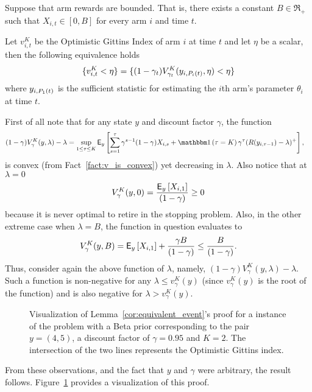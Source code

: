 \begin{lemma} \label{cor:equivalent_event}
	Suppose that arm rewards are bounded. That is, there exists a constant $B \in \Re_+$ such that $X_{i,t} \in [0, B]$ for every arm $i$ and time $t$. 
	
	Let $v^K_{i,t}$ be the Optimistic Gittins Index of arm $i$ at time $t$ and let $\eta$ be a scalar, then the following equivalence holds
	\[
	\{v^K_{i,t} < \eta \} = \{(1-\gamma_t)V^K_{\gamma_t}(y_{i,P_{i}(t)}, \eta) < \eta\}\]
	where $y_{i,P_{1}(t)}$ is the sufficient statistic for estimating the $i$th arm's parameter $\theta_i$ at time $t$.
\end{lemma}
\begin{myproof}[Proof.]
	First of all note that for any state $y$ and discount factor $\gamma$, the function
	\begin{align*}
	(1-\gamma)V^K_\gamma(y, \lambda) - \lambda&  = \sup_{1 \le \tau \le K}\E_y\left[\sum_{s=1}^\tau\gamma^{s-1}(1-\gamma)X_{i,s} + \ind{\tau = K}\gamma^\tau(R(y_{i,\tau-1}) - \lambda)^+\right],
	\end{align*}
	is convex (from Fact~\ref{fact:v_is_convex}) yet decreasing in $\lambda$. Also notice that at $\lambda = 0$
	\[
		V^K_{\gamma}(y, 0) = \frac{\mathsf{E}_y\left[X_{i,1}\right]}{(1-\gamma)} \ge 0
	\]
	because it is never optimal to retire in the stopping problem. Also, in the other extreme case when $\lambda = B$, the function in question evaluates to
	\[
		V^K_{\gamma}(y, B) = \mathsf{E}_y\left[X_{i,1}\right] + \frac{\gamma B}{(1-\gamma)} \le \frac{B}{(1-\gamma)}.
	\]
	Thus, consider again the above function of $\lambda$, namely,  $(1-\gamma)V^K_\gamma(y, \lambda) - \lambda$. Such a function is non-negative for any $\lambda \le v^K_\gamma(y)$ (since $v^K_\gamma(y)$ is the root of the function) and is also negative for $\lambda > v^K_\gamma(y)$.
	\begin{figure}
		\centering
		 
		\caption{Visualization of Lemma~\ref{cor:equivalent_event}'s proof for a instance of the problem with a Beta prior corresponding to the pair $y = (4,5)$, a discount factor of $\gamma=0.95$ and $K = 2$. The intersection of the two lines represents the Optimistic Gittins index.}
		\label{fig:visaulize_gx_proof}
	\end{figure}
	From these observations, and the fact that $y$ and $\gamma$ were arbitrary, the result follows. Figure~\ref{fig:visaulize_gx_proof} provides a visualization of this proof.
\end{myproof}



